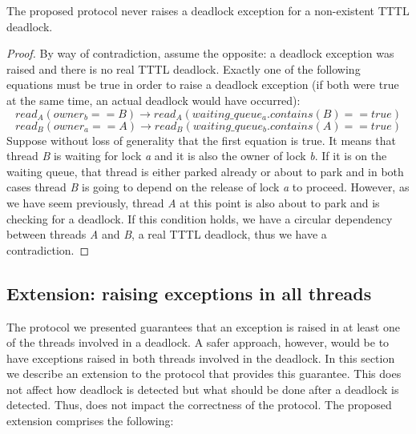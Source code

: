 \begin{lemma}
The proposed protocol never raises a deadlock exception for a non-existent TTTL deadlock.
\end{lemma}
\begin{proof}
By way of contradiction, assume the opposite: a deadlock exception was raised and there is no real TTTL deadlock. Exactly one of the following equations must be true in order to raise a deadlock exception (if both were true at the same time, an actual deadlock would have occurred):
\begin{equation}
read_{A}(owner_{b} == B) \rightarrow read_{A}(waiting\_queue_{a}.contains(B) == true)
\end{equation}
\begin{equation}
read_{B}(owner_{a} == A) \rightarrow read_{B}(waiting\_queue_{b}.contains(A) == true)
\end{equation}
Suppose without loss of generality that the first equation is true.
It means that thread \emph{B} is waiting for lock \emph{a} and it is also the owner of lock \emph{b}.
If it is on the waiting queue, that thread is either parked already or about to park
and in both cases thread \emph{B} is going to depend on the release of lock \emph{a} to proceed.
However, as we have seem previously, thread \emph{A} at this point is also about to park and is checking for a deadlock.
If this condition holds, we have a circular dependency between threads \emph{A} and \emph{B}, a real TTTL deadlock, thus we have a contradiction.
\end{proof}

\subsection{Extension: raising exceptions in all threads}

The protocol we presented guarantees that an exception is raised in at least one of the threads involved in a deadlock. A safer approach, however, would be to have exceptions raised in both threads involved in the deadlock. In this section we describe an extension to the protocol that provides this guarantee. This does not affect how deadlock is detected but what should be done after a deadlock is detected. Thus, does not impact the correctness of the protocol. The proposed extension comprises the following:

